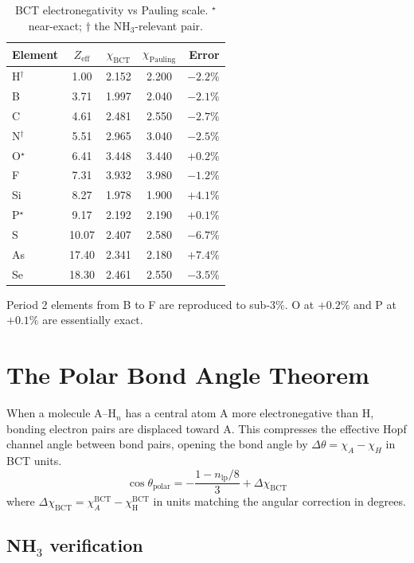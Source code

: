 \documentclass[aps,prl,twocolumn,superscriptaddress,floatfix]{revtex4-2}
\begin{document}
\begin{table}[h]
\caption{BCT electronegativity vs Pauling scale.
$^\star$ near-exact; $\dagger$ the NH$_3$-relevant pair.}
\begin{tabular}{lcccr}
\toprule
Element & $Z_\mathrm{eff}$ & $\chi_\mathrm{BCT}$
  & $\chi_\mathrm{Pauling}$ & Error \\
\midrule
H$^\dagger$  & 1.00 & 2.152 & 2.200 & $-2.2\%$ \\
B   & 3.71 & 1.997 & 2.040 & $-2.1\%$ \\
C   & 4.61 & 2.481 & 2.550 & $-2.7\%$ \\
N$^\dagger$  & 5.51 & 2.965 & 3.040 & $-2.5\%$ \\
O$^\star$   & 6.41 & 3.448 & 3.440 & $+0.2\%$ \\
F   & 7.31 & 3.932 & 3.980 & $-1.2\%$ \\
Si  & 8.27 & 1.978 & 1.900 & $+4.1\%$ \\
P$^\star$   & 9.17 & 2.192 & 2.190 & $+0.1\%$ \\
S   & 10.07 & 2.407 & 2.580 & $-6.7\%$ \\
As  & 17.40 & 2.341 & 2.180 & $+7.4\%$ \\
Se  & 18.30 & 2.461 & 2.550 & $-3.5\%$ \\
\bottomrule
\end{tabular}
\end{table}

Period 2 elements from B to F are reproduced to sub-3\%.
O at $+0.2\%$ and P at $+0.1\%$ are essentially exact.

\section{The Polar Bond Angle Theorem}

When a molecule A--H$_n$ has a central atom A more
electronegative than H, bonding electron pairs are displaced
toward A. This compresses the effective Hopf channel angle
between bond pairs, opening the bond angle by
$\Delta\theta = \chi_A - \chi_H$ in BCT units.
\begin{equation}
  \boxed{
  \cos\theta_\mathrm{polar} = -\frac{1 - n_\mathrm{lp}/8}{3}
  + \Delta\chi_\mathrm{BCT}
  }
  \label{eq:polar}
\end{equation}
where $\Delta\chi_\mathrm{BCT} = \chi_A^\mathrm{BCT}
- \chi_\mathrm{H}^\mathrm{BCT}$ in units matching the
angular correction in degrees.

\subsection{NH\texorpdfstring{$_3$}{3} verification}
\end{document}
